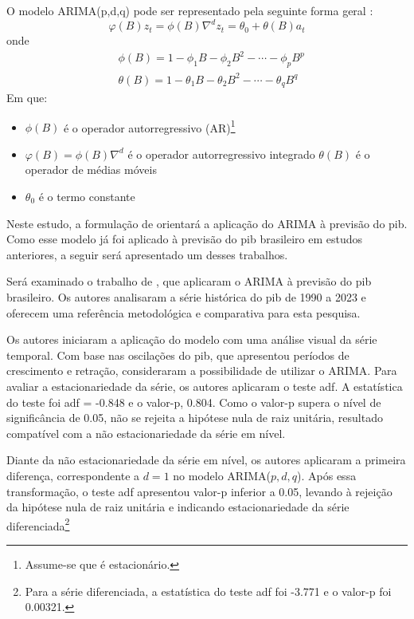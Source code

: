 O modelo ARIMA(p,d,q) pode ser representado pela seguinte forma geral :
\begin{equation}
	\label{eq:ARIMA_model}
	\varphi(B)z_t = \phi(B)\nabla^dz_t = \theta_0 + \theta(B)a_t
\end{equation}
onde
\begin{align*}
	&\phi(B) = 1 - \phi_1B - \phi_2B^2-\cdots-\phi_pB^p \\
	&\theta(B) = 1 - \theta_1B - \theta_2B^2-\cdots-\theta_qB^q
\end{align*}
Em que:
\begin{itemize}
	\item[a)] $\phi(B)$ é o operador autorregressivo (AR)\footnote{Assume-se que é estacionário.}
	\item[b)] $\varphi(B) = \phi(B)\nabla^d$ é o operador autorregressivo integrado
	$\theta(B)$ é o operador de médias móveis
	\item[d)] $\theta_0$ é o termo constante
\end{itemize}

Neste estudo, a formulação de  orientará a aplicação do ARIMA à previsão do \ac{pib}. Como esse modelo já foi aplicado à previsão do \ac{pib} brasileiro em estudos anteriores, a seguir será apresentado um desses trabalhos.


Será examinado o trabalho de , que aplicaram o ARIMA à previsão do \ac{pib} brasileiro. Os autores analisaram a série histórica do \ac{pib} de 1990 a 2023 e oferecem uma referência metodológica e comparativa para esta pesquisa.

Os autores iniciaram a aplicação do modelo com uma análise visual da série temporal. Com base nas oscilações do \ac{pib}, que apresentou períodos de crescimento e retração, consideraram a possibilidade de utilizar o ARIMA.
Para avaliar a estacionariedade da série, os autores aplicaram o teste \ac{adf}. A estatística do teste foi \ac{adf} = -0.848 e o valor-p, 0.804. Como o valor-p supera o nível de significância de 0.05, não se rejeita a hipótese nula de raiz unitária, resultado compatível com a não estacionariedade da série em nível.

Diante da não estacionariedade da série em nível, os autores aplicaram a primeira diferença, correspondente a $d=1$ no modelo ARIMA($p,d,q$). Após essa transformação, o teste \ac{adf} apresentou valor-p inferior a 0.05, levando à rejeição da hipótese nula de raiz unitária e indicando estacionariedade da série diferenciada\footnote{Para a série diferenciada, a estatística do teste \ac{adf} foi -3.771 e o valor-p foi 0.00321.}

